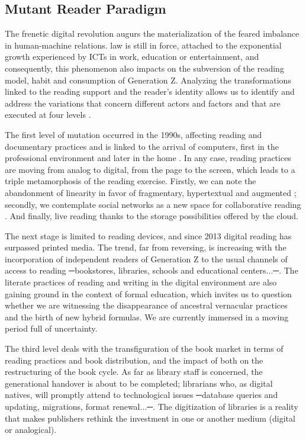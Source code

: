 \documentclass[english]{textolivre}
\begin{document}
\subsection{Mutant Reader Paradigm}
The frenetic digital revolution augurs the materialization of the feared imbalance in human-machine relations.  law is still in force, attached to the exponential growth experienced by ICTs in work, education or entertainment, and consequently, this phenomenon also impacts on the subversion of the reading model, habit and consumption of Generation Z. Analyzing the transformations linked to the reading support and the reader's identity allows us to identify and address the variations that concern different actors and factors and that are executed at four levels \cite{soccavo2013inventar}.

The first level of mutation occurred in the 1990s, affecting reading and documentary practices and is linked to the arrival of computers, first in the professional environment and later in the home \cite{birkerts1999elegia}. In any case, reading practices are moving from analog to digital, from the page to the screen, which leads to a triple metamorphosis of the reading exercise. Firstly, we can note the abandonment of linearity in favor of fragmentary, hypertextual and augmented \cite{tabernero_sala_habitos_2020}; secondly, we contemplate social networks as a new space for collaborative reading \cite{barton_language_2013, manresa2016practicas}. And finally, live reading thanks to the storage possibilities offered by the cloud.

The next stage is limited to reading devices, and since 2013 digital reading has surpassed printed media. The trend, far from reversing, is increasing with the incorporation of independent readers of Generation Z to the usual channels of access to reading ─bookstores, libraries, schools and educational centers...─. The literate practices of reading and writing in the digital environment are also gaining ground in the context of formal education, \cite{alvarez_ramos_entornos_2018} which invites us to question whether we are witnessing the disappearance of ancestral vernacular practices and the birth of new hybrid formulas. We are currently immersed in a moving period full of uncertainty.

The third level deals with the transfiguration of the book market in terms of reading practices and book distribution, and the impact of both on the restructuring of the book cycle. As far as library staff is concerned, the generational handover is about to be completed; librarians who, as digital natives, will promptly attend to technological issues ─database queries and updating, migrations, format renewal...─. The digitization of libraries is a reality that makes publishers rethink the investment in one or another medium (digital or analogical).
\end{document}
